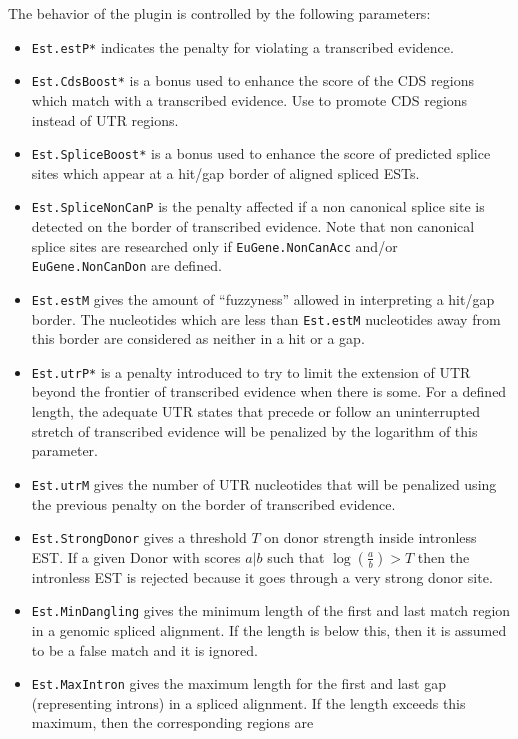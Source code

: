 The behavior of the plugin is controlled by the following parameters:
\begin{itemize}
\item \texttt{Est.estP*} indicates the penalty for violating a transcribed
  evidence.
\item \texttt{Est.CdsBoost*} is a bonus used to enhance the score 
  of the CDS regions which match with a transcribed evidence. 
  Use to promote CDS regions instead of UTR regions.
\item \texttt{Est.SpliceBoost*} is a bonus used to enhance the score 
  of predicted splice sites which appear at a hit/gap border of aligned 
  spliced ESTs.
\item \texttt{Est.SpliceNonCanP} is the penalty affected if a non canonical
  splice site is detected on the border of transcribed evidence. Note that 
  non canonical splice sites are researched only if \texttt{EuGene.NonCanAcc} 
  and/or \texttt{EuGene.NonCanDon} are defined.
\item \texttt{Est.estM} gives the amount of ``fuzzyness'' allowed in
  interpreting a hit/gap border. The nucleotides which are less than
  \texttt{Est.estM} nucleotides away from this border are considered
  as neither in a hit or a gap.
\item \texttt{Est.utrP*} is a penalty introduced to try to limit the
  extension of UTR beyond the frontier of transcribed evidence when
  there is some. For a defined length, the adequate UTR states that
  precede or follow an uninterrupted stretch of transcribed evidence
  will be penalized by the logarithm of this parameter.
\item \texttt{Est.utrM} gives the number of UTR nucleotides that will
  be penalized using the previous penalty on the border of transcribed
  evidence.
\item \texttt{Est.StrongDonor} gives a threshold $T$ on donor strength
  inside intronless EST. If a given Donor with scores $a|b$ such that
  $\log(\frac{a}{b}) >T$ then the intronless EST is rejected because
  it goes through a very strong donor site.
\item \texttt{Est.MinDangling} gives the minimum length of the first
  and last match region in a genomic spliced alignment. If the length
  is below this, then it is assumed to be a false match and it is
  ignored.
\item \texttt{Est.MaxIntron} gives the maximum length for the first
  and last gap (representing introns) in a spliced alignment. If the
  length exceeds this maximum, then the corresponding regions are

\end{itemize}
